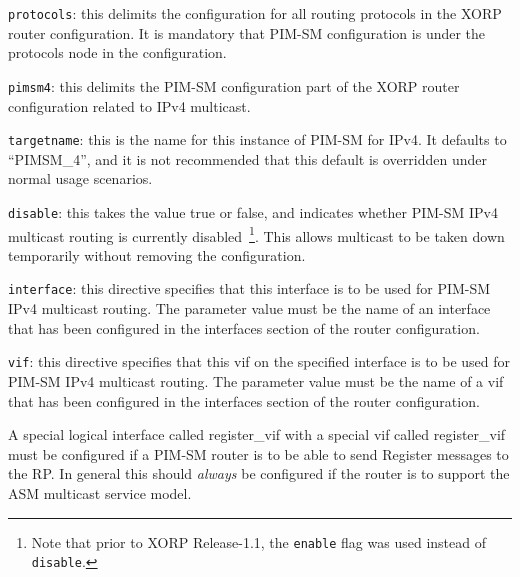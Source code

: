 \begin{description}
\item{\tt protocols}: this delimits the configuration for all routing
  protocols in the XORP router configuration.  It is mandatory that
  PIM-SM configuration is under the {\stt protocols} node in the
  configuration.
\item{\tt pimsm4}: this delimits the PIM-SM configuration part of the XORP
  router configuration related to IPv4 multicast.
\item{\tt targetname}: this is the name for this instance of PIM-SM for
  IPv4.  It defaults to ``{\stt PIMSM\_4}'', and it is not recommended
  that this default is overridden under normal usage scenarios.
\item{\tt disable}: this takes the value {\stt true} or {\stt false},
  and indicates whether PIM-SM IPv4 multicast routing is currently
  disabled~\footnote{Note
  that prior to XORP Release-1.1, the {\tt enable} flag was used instead of
  {\tt disable}.}.
  This allows multicast to be taken down temporarily without
  removing the configuration.
\item{\tt interface}: this directive specifies that this {\stt
  interface} is to be used for PIM-SM IPv4 multicast routing.  The
  parameter value must be the name of an interface that has been
  configured in the {\stt interfaces} section of the router
  configuration.
\item{\tt vif}: this directive specifies that this {\stt vif}
  on the specified {\stt interface} is to be used for PIM-SM IPv4
  multicast routing.  The parameter value must be the name of a vif
  that has been configured in the {\stt interfaces} section of the
  router configuration.

  A special logical interface called {\stt register\_vif} with a
  special vif called {\stt register\_vif} must be configured if a
  PIM-SM router is to be able to send Register messages to the RP.  In
  general this should {\it always} be configured if the router is to
  support the ASM multicast service model.


\end{description}
